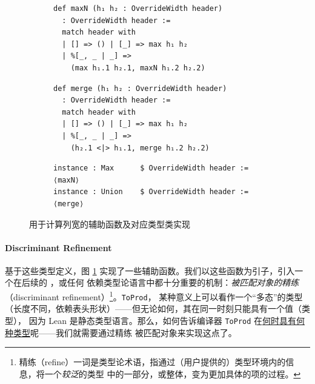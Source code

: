 \begin{figure}[htb]
\centering
\begin{subfigure}{0.55\textwidth}\centering
\begin{verbatim}
def maxN (h₁ h₂ : OverrideWidth header)
  : OverrideWidth header :=
  match header with
  | [] => () | [_] => max h₁ h₂
  | %[_, _ | _] =>
    (max h₁.1 h₂.1, maxN h₁.2 h₂.2)
\end{verbatim}
\end{subfigure}%
\begin{subfigure}{0.5\textwidth}\centering
\begin{verbatim}
def merge (h₁ h₂ : OverrideWidth header)
  : OverrideWidth header :=
  match header with
  | [] => () | [_] => max h₁ h₂
  | %[_, _ | _] =>
    (h₂.1 <|> h₁.1, merge h₁.2 h₂.2)
\end{verbatim}
\end{subfigure}\vspace{.5em}
\begin{subfigure}{\textwidth}\centering
\begin{verbatim}
instance : Max      $ OverrideWidth header := ⟨maxN⟩
instance : Union    $ OverrideWidth header := ⟨merge⟩
\end{verbatim}
\end{subfigure}
\caption{用于计算列宽的辅助函数及对应类型类实现}\label{code:pp-col}
\end{figure}

{\setlength{\parskip}{-1em}\paragraph{Discriminant Refinement} 基于这些类型定义，图 \ref{code:pp-col} 实现了一些辅助函数。我们以这些函数为引子，引入一个在后续的 \Tigrisd，或任何
依赖类型论语言中都十分重要的机制：\emph{被匹配对象的精练}（discriminant refinement）\footnote{
精练（refine）一词是类型论术语，指通过（用户提供的）类型环境内的信息，将一个\emph{较泛}的类型
中的一部分，或整体，变为更加具体的项的过程。
}。\texttt{ToProd}，
某种意义上可以看作一个“多态”的类型（长度不同，依赖表头形状）——但无论如何，其在同一时刻只能具有一个值（类型），
因为 Lean 是静态类型语言。那么，如何告诉编译器 \texttt{ToProd} 在\underline{何时具有何种类型}呢——我们就需要通过精练
被匹配对象来实现这点了。}

